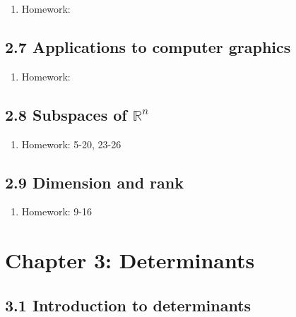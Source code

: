 \documentclass{article}
\begin{document}
\begin{enumerate}

\item Homework: 

\end{enumerate}

\subsection{2.7 Applications to computer graphics}

\begin{enumerate}

\item Homework: 

\end{enumerate}

\subsection{2.8 Subspaces of $\mathbb{R}^n$}

\begin{enumerate}

\item Homework: 5-20, 23-26

\end{enumerate}

\subsection{2.9 Dimension and rank}

\begin{enumerate}

\item Homework: 9-16

\end{enumerate}

\section{Chapter 3: Determinants} 

\subsection{3.1 Introduction to determinants}
\end{document}
